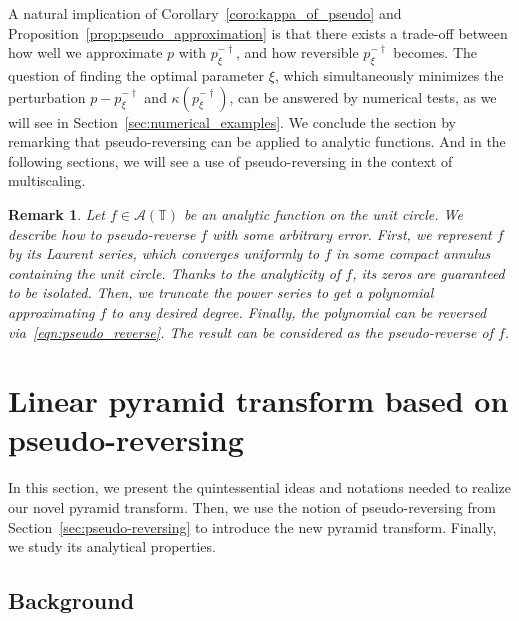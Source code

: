 \documentclass[12pt]{article}
\newtheorem{remark}{Remark}[section]
\begin{document}
A natural implication of Corollary~\ref{coro:kappa_of_pseudo} and Proposition~\ref{prop:pseudo_approximation} is that there exists a trade-off between how well we approximate $p$ with $p_\xi^{-\dagger}$, and how reversible $p_\xi^{-\dagger}$ becomes. The question of finding the optimal parameter $\xi$, which simultaneously minimizes the perturbation $p-p_\xi^{-\dagger}$ and $\kappa(p_\xi^{-\dagger})$, can be answered by numerical tests, as we will see in Section~\ref{sec:numerical_examples}. We conclude the section by remarking that pseudo-reversing can be applied to analytic functions. And in the following sections, we will see a use of pseudo-reversing in the context of multiscaling.

\begin{remark}
    Let $f\in\mathcal{A}(\mathbb{T})$ be an analytic function on the unit circle. We describe how to pseudo-reverse $f$ with some arbitrary error. First, we represent $f$ by its Laurent series, which converges uniformly to $f$ in some compact annulus containing the unit circle. Thanks to the analyticity of $f$, its zeros are guaranteed to be isolated. Then, we truncate the power series to get a polynomial approximating $f$ to any desired degree. Finally, the polynomial can be reversed via~\eqref{eqn:pseudo_reverse}. The result can be considered as the pseudo-reverse of $f$.
\end{remark}


\section{Linear pyramid transform based on pseudo-reversing} \label{sec:linearPyramidTrans}

In this section, we present the quintessential ideas and notations needed to realize our novel pyramid transform. Then, we use the notion of pseudo-reversing from Section~\ref{sec:pseudo-reversing} to introduce the new pyramid transform. Finally, we study its analytical properties.

\subsection{Background}
\end{document}
